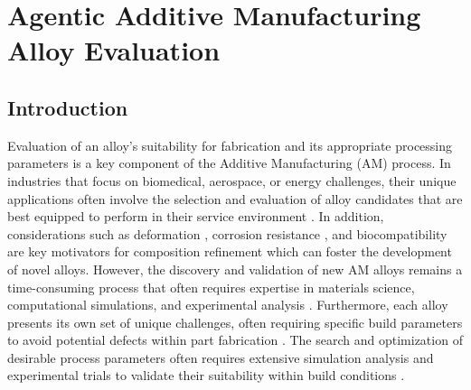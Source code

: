 \chapter{Agentic Additive Manufacturing Alloy Evaluation}
\label{chapter:alloy_mcp}

\section{Introduction}
Evaluation of an alloy's suitability for fabrication and its appropriate
processing parameters is a key component of the Additive Manufacturing (AM)
process. In industries that focus on biomedical, aerospace, or energy
challenges, their unique applications often involve the selection and evaluation
of alloy candidates that are best equipped to perform in their service
environment \cite{bandyopadhyay_additive_2018, bandyopadhyay_alloy_2022,
ghafarollahi_atomagents_2024, tammas-williams_design_2017,
polonsky_closing_2020, sames_metallurgy_2016}. In addition, considerations such
as deformation \cite{jadhav_stressd_2023, rashid_review_2023, paul_effect_2014},
corrosion resistance \cite{bandyopadhyay_additive_2018, xu_corrosion_2020}, and
biocompatibility \cite{pesode_additive_2022, pesode_additive_2023,
jiao_additive_2022} are key motivators for composition refinement which can
foster the development of novel alloys. However, the discovery and validation of
new AM alloys remains a time-consuming process that often requires expertise in
materials science, computational simulations, and experimental analysis
\cite{bandyopadhyay_alloy_2022, tammas-williams_design_2017,
polonsky_closing_2020}. Furthermore, each alloy presents its own set of unique
challenges, often requiring specific build parameters to avoid potential defects
within part fabrication \cite{bandyopadhyay_alloy_2022, ghanadi_effect_2025,
edwards_electron_2013, vrancken_heat_2012, jelis_metallurgical_2015,
popovich_microstructure_2016, lu_microstructure_2015, huang_microstructure_2025,
martendal_mitigating_2025}. The search and optimization of desirable process
parameters often requires extensive simulation analysis and  experimental trials
to validate their suitability within build conditions \cite{rashid_review_2023,
honarmandi_rigorous_2021, tang_prediction_2017, tang_rapid_2016,
tan_graded_2015}.

